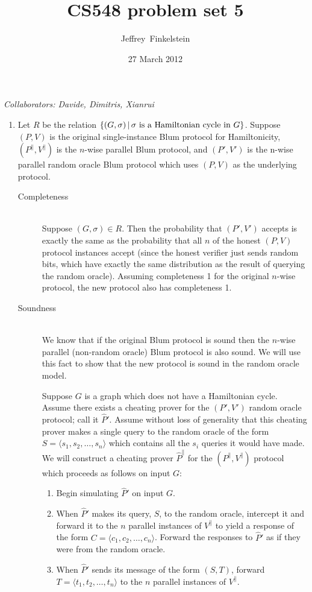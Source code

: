 \documentclass[draft]{article}
\author{Jef{}frey~Finkelstein}
\date{27 March 2012}
\title{CS548 problem set 5}
\newcommand{\collaborators}[1]{\emph{Collaborators: #1}}
\begin{document}
\maketitle
\collaborators{Davide, Dimitris, Xianrui}
\begin{enumerate}
\item
  Let $R$ be the relation $\left\{(G, \sigma) \,\middle|\, \sigma \textnormal{ is a Hamiltonian cycle in } G\right\}$.
  Suppose $(P, V)$ is the original single-instance Blum protocol for Hamiltonicity, $(P^{\parallel}, V^{\parallel})$ is the $n$-wise parallel Blum protocol, and $(P', V')$ is the n-wise parallel random oracle Blum protocol which uses $(P, V)$ as the underlying protocol.
  \begin{description}
  \item[Completeness] \hfill \\
    Suppose $(G, \sigma)\in R$.
    Then the probability that $(P', V')$ accepts is exactly the same as the probability that all $n$ of the honest $(P, V)$ protocol instances accept (since the honest verifier just sends random bits, which have exactly the same distribution as the result of querying the random oracle).
    Assuming completeness 1 for the original $n$-wise protocol, the new protocol also has completeness 1.
  \item[Soundness] \hfill \\
    We know that if the original Blum protocol is sound then the $n$-wise parallel (non-random oracle) Blum protocol is also sound.
    We will use this fact to show that the new protocol is sound in the random oracle model.

    Suppose $G$ is a graph which does not have a Hamiltonian cycle.
    Assume there exists a cheating prover for the $(P', V')$ random oracle protocol; call it $\hat{P}'$.
    Assume without loss of generality that this cheating prover makes a single query to the random oracle of the form $S=\langle s_1, s_2, \ldots, s_n \rangle$ which contains all the $s_i$ queries it would have made.
    We will construct a cheating prover $\hat{P}^{\parallel}$ for the $(P^\parallel, V^\parallel)$ protocol which proceeds as follows on input $G$:
    \begin{enumerate}
    \item Begin simulating $\hat{P}'$ on input $G$.
    \item
      When $\hat{P}'$ makes its query, $S$, to the random oracle, intercept it and forward it to the $n$ parallel instances of $V^\parallel$ to yield a response of the form $C = \langle c_1, c_2, \ldots, c_n \rangle$.
      Forward the responses to $\hat{P}'$ as if they were from the random oracle.
    \item When $\hat{P}'$ sends its message of the form $(S, T)$, forward $T=\langle t_1, t_2, \ldots, t_n \rangle$ to the $n$ parallel instances of $V^\parallel$.
    \end{enumerate}


\end{description}
\end{enumerate}
\end{document}

